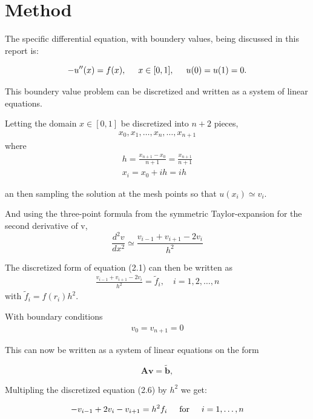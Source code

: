 \documentclass[11pt,a4paper,english]{article}
\numberwithin{equation}{section}
\newcommand{\ve}[1]{\mathbf{#1}} %
\newcommand{\spac}{\hspace{5mm}}
\begin{document}
\section{Method}

The specific differential equation, with boundery values, being discussed in this report is: 

\begin{equation}
-u''(x) = f(x), \spac x \in [0,1], \spac u(0) = u(1) = 0.
\end{equation}

This boundery value problem can be discretized and written as a system of linear equations.

Letting the domain $x \in [0,1]$ be discretized into $n+2$ pieces,
\begin{gather}
x_0, x_1, \dots, x_{n}, \dots, x_{n+1}
\end{gather}
where 
\begin{gather}
h = \frac{x_{n+1} - x_0}{n+1} = \frac{x_{n+1}}{n+1}\\
x_i = x_0 + ih = ih
\end{gather}

an then sampling the solution at the mesh points so that $u(x_i) \simeq v_i$.

And using the three-point formula from the symmetric 
Taylor-expansion for the second derivative of v,
\begin{equation}
\frac{d^2v}{dx^2} \simeq \frac{v_{i-1} + v_{i+1} - 2v_i}{h^2}
\end{equation}

The discretized form of equation (2.1) can then be written as
\begin{gather}
\frac{v_{i-1} + v_{i+1} - 2v_i}{h^2} = \tilde{f}_i , \quad i=1,2, \dots, n 
\end{gather}
with $\tilde{f}_i = f(r_i) h^2$.

With boundary conditions 
\begin{gather}
v_0 = v_{n+1} = 0
\end{gather}

This can now be written as a system of linear equations on the form 

\begin{equation}
   \ve{A}\ve{v} = \tilde{\ve{b}},
   \label{eq:Avb}
\end{equation}

Multipling the discretized equation (2.6) by $h^2$ we get:

\begin{gather*}
   -v_{i-1}+2v_{i}-v_{i+1}=h^2 f_i \hspace{0.5cm} \mathrm{for} \hspace{0.5cm} i=1,\dots, n 
\end{gather*}
\end{document}
